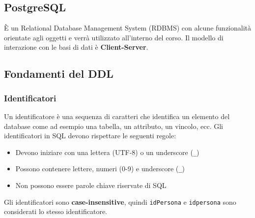 \documentclass[a4paper,twoside]{article}
\begin{document}
\subsection{PostgreSQL}
È un Relational Database Management System (RDBMS) con alcune funzionalità orientate
agli oggetti e verrà utilizzato all'interno del corso. Il modello di interazione con
le basi di dati è \textbf{Client-Server}.

\subsection{Fondamenti del DDL}
\subsubsection{Identificatori}
Un identificatore è una sequenza di caratteri che identifica un elemento del database
come ad esempio una tabella, un attributo, un vincolo, ecc. Gli identificatori in SQL
devono rispettare le seguenti regole:
\begin{itemize}
  \item Devono iniziare con una lettera (UTF-8) o un underscore (\texttt{\_})
  \item Possono contenere lettere, numeri (0-9) e underscore (\texttt{\_})
  \item Non possono essere parole chiave riservate di SQL
\end{itemize}
Gli identificatori sono \textbf{case-insensitive}, quindi \texttt{idPersona} e
\texttt{idpersona} sono considerati lo stesso identificatore.
\end{document}
